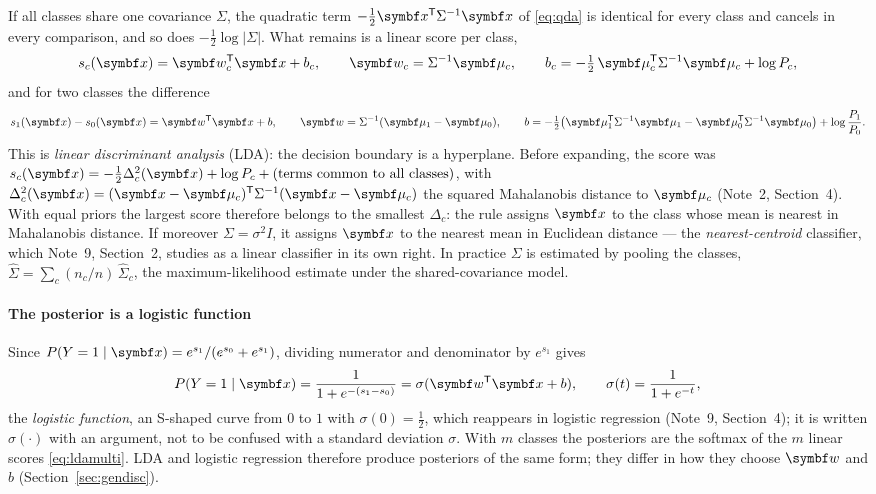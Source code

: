 \documentclass[11pt]{article}
\newcommand{\w}{\vect{w}}
\begin{document}
If all classes share one covariance $\Sigma$, the quadratic term $-\tfrac12 \x\T \Sigma^{-1} \x$ of \eqref{eq:qda} is
identical for every class and cancels in every comparison, and so does $-\tfrac12 \log\lvert\Sigma\rvert$. What remains
is a linear score per class,
\begin{equation}\label{eq:ldamulti}
  s_c(\x) = \w_c\T \x + b_c, \qquad \w_c = \Sigma^{-1} \vmu_c, \qquad b_c = -\tfrac12\, \vmu_c\T \Sigma^{-1} \vmu_c + \log P_c ,
\end{equation}
and for two classes the difference
\begin{equation}\label{eq:lda}
  s_1(\x) - s_0(\x) = \w\T\x + b, \qquad \w = \Sigma^{-1}(\vmu_1 - \vmu_0), \qquad
  b = -\tfrac12 \big(\vmu_1\T\Sigma^{-1}\vmu_1 - \vmu_0\T\Sigma^{-1}\vmu_0\big) + \log\frac{P_1}{P_0} .
\end{equation}
This is \emph{linear discriminant analysis} (LDA): the decision boundary is a hyperplane. Before expanding, the score
was $s_c(\x) = -\tfrac12 \Delta_c^2(\x) + \log P_c + \text{(terms common to all classes)}$, with
$\Delta_c^2(\x) = (\x - \vmu_c)\T \Sigma^{-1} (\x - \vmu_c)$ the squared Mahalanobis distance to $\vmu_c$ (Note~2,
Section~4). With equal priors the largest score therefore belongs to the smallest $\Delta_c$: the rule assigns $\x$ to
the class whose mean is nearest in Mahalanobis distance. If moreover $\Sigma = \sigma^2 I$, it assigns $\x$ to the
nearest mean in Euclidean distance --- the \emph{nearest-centroid} classifier, which Note~9, Section~2, studies as a
linear classifier in its own right. In practice $\Sigma$ is estimated by
pooling the classes, $\hat\Sigma = \sum_c (n_c/n)\, \hat\Sigma_c$, the maximum-likelihood estimate under the shared-covariance
model.

\paragraph{The posterior is a logistic function} Since $P(Y = 1 \mid \x) = e^{s_1} / (e^{s_0} + e^{s_1})$, dividing
numerator and denominator by $e^{s_1}$ gives
\[
  P(Y = 1 \mid \x) = \frac{1}{1 + e^{-(s_1 - s_0)}} = \sigma(\w\T\x + b), \qquad \sigma(t) = \frac{1}{1 + e^{-t}} ,
\]
the \emph{logistic function}, an S-shaped curve from $0$ to $1$ with $\sigma(0) = \tfrac12$, which reappears in
logistic regression (Note~9, Section~4); it is written $\sigma(\cdot)$ with an argument, not to be confused with a
standard deviation $\sigma$. With $m$ classes the posteriors are the softmax of the $m$ linear scores
\eqref{eq:ldamulti}. LDA and logistic regression therefore produce posteriors of the same form; they differ in how
they choose $\w$ and $b$ (Section~\ref{sec:gendisc}).
\end{document}
